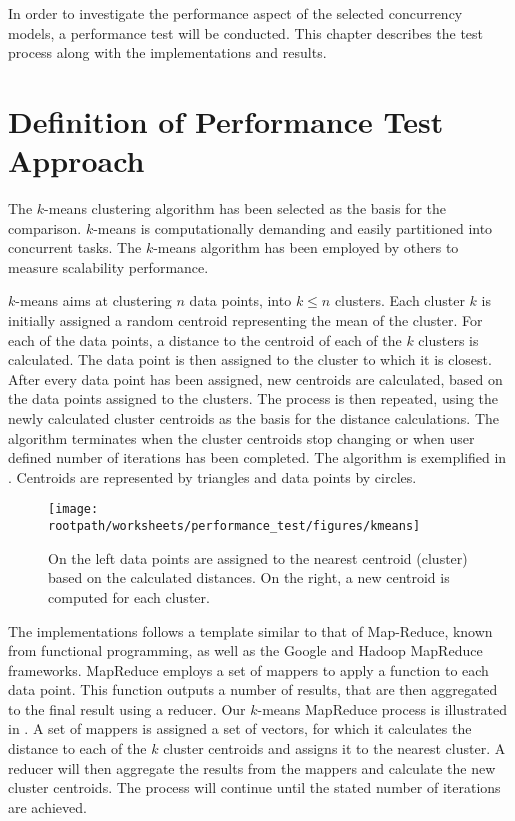 \makeatletter {}\makeatother
{}
%
In order to investigate the performance aspect of the selected concurrency models, a performance test will be conducted.  This chapter describes the test process along with the implementations and results. 
\label{chap:performance}
\section{Definition of Performance Test Approach}
The $k$-means clustering algorithm has been selected as the basis for the comparison. $k$-means is computationally demanding and easily partitioned into concurrent tasks\cite[p. 128]{epstein2011towards}. The $k$-means algorithm has been employed by others to measure scalability performance\cite{epstein2011towards}\cite{tardieu2014x10}.

$k$-means aims at clustering $n$ data points, into $k \leq n$ clusters\cite[p. 451]{dataminingconceptsandtechniques}\cite[p. 128]{epstein2011towards}. Each cluster $k$ is initially assigned a random centroid representing the mean of the cluster. For each of the data points, a distance to the centroid of each of the $k$ clusters is calculated. The data point is then assigned to the cluster to which it is closest. After every data point has been assigned, new centroids are calculated, based on the data points assigned to the clusters. The process is then repeated, using the newly calculated cluster centroids as the basis for the distance calculations. The algorithm terminates when the cluster centroids stop changing or when user defined number of iterations has been completed\cite[p. 128]{epstein2011towards}. The algorithm is exemplified in . Centroids are represented by triangles and data points by circles.

\begin{figure}[ht!]
\centering
\texttt{[image: \\rootpath/worksheets/performance\_test/figures/kmeans]}
\caption{On the left data points are assigned to the nearest centroid (cluster) based on the calculated distances. On the right, a new centroid is computed for each cluster.}\label{fig:kmeans}
\end{figure}

The implementations follows a template similar to that of Map-Reduce\cite{dean2008mapreduce}, known from functional programming, as well as the Google and Hadoop MapReduce frameworks. MapReduce employs a set of mappers to apply a function to each data point. This function outputs a number of results, that are then aggregated to the final result using a reducer. Our $k$-means MapReduce process is illustrated in . A set of mappers is assigned a set of vectors, for which it calculates the distance to each of the $k$ cluster centroids and assigns it to the nearest cluster. A reducer will then aggregate the results from the mappers and calculate the new cluster centroids. The process will continue until the stated number of iterations are achieved.

